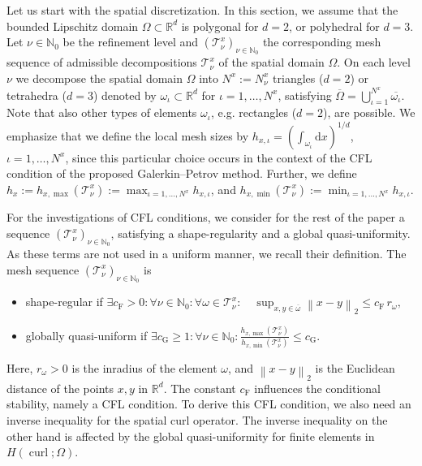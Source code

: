 \documentclass[a4paper,11pt]{article}
\newcommand{\N}{\mathbb N}
\newcommand{\R}{\mathbb R}
\newcommand{\cu}{\operatorname{curl}}
\newcommand{\norm}[1]{{\left\lVert{#1}\right\rVert}}
\begin{document}
Let us start with the spatial discretization. In this section, we assume that the bounded Lipschitz domain $\Omega \subset \R^d$ is polygonal for $d=2$, or polyhedral for $d=3$. Let $\nu \in \N_0$ be the refinement level and $( \mathcal T^x_\nu )_{\nu \in \N_0}$ the corresponding mesh sequence of admissible decompositions $\mathcal T^x_\nu$ of the spatial domain $\Omega$. On each level $\nu$ we decompose the spatial domain $\Omega$ into $N^x:=N^x_\nu$ triangles ($d=2$) or tetrahedra ($d=3$) denoted by $\omega_\iota \subset \R^d$ for $\iota=1,\dots, N^x$, satisfying $\overline{\Omega} = \bigcup_{\iota=1}^{N^x} \overline{\omega_{\iota}}.$ Note that also other types of elements $\omega_\iota$, e.g. rectangles ($d=2$), are possible. We emphasize that we define the local mesh sizes by $h_{x,\iota} = \left( \int_{\omega_\iota} \mathrm dx \right)^{1/d}$, $\iota=1,\dots, N^x$, since this particular choice occurs in the context of the CFL condition of the proposed Galerkin--Petrov method. Further, we define $h_x := h_{x,\max}(\mathcal T^x_\nu) := \max_{\iota=1,\dots, N^x} h_{x,\iota}$, and $h_{x,\min}(\mathcal T^x_\nu) := \min_{\iota=1,\dots, N^x} h_{x,\iota}$. 

For the investigations of CFL conditions, we consider for the rest of the paper a sequence $( \mathcal T^x_\nu )_{\nu \in \N_0}$, satisfying a shape-regularity and a global quasi-uniformity. As these terms are not used in a uniform manner, we recall their definition. The mesh sequence $( \mathcal T^x_\nu )_{\nu \in \N_0}$ is
\begin{itemize}
  \item shape-regular if $\exists c_\mathrm F > 0: \forall \nu \in \N_0 : \forall \omega \in \mathcal T^x_\nu: \quad \sup_{x,y \in \overline{\omega} } \norm{x- y}_2 \leq c_\mathrm F\, r_\omega,$
  \item globally quasi-uniform if $\exists c_\mathrm G \geq 1: \forall \nu \in \N_0 :  \frac{h_{x,\max}(\mathcal T^x_\nu)}{h_{x,\min}(\mathcal T^x_\nu)} \leq c_\mathrm G.$
\end{itemize}
Here, $r_\omega >0$ is the inradius of the element $\omega$, and $\norm{x-y}_2$ is the Euclidean distance of the points $x,y$ in $\R^d.$  The constant $c_{\mathrm F}$ influences the conditional stability, namely a CFL condition. To derive this CFL condition, we also need an inverse inequality for the spatial curl operator. The inverse inequality on the other hand is affected by the global quasi-uniformity for finite elements in $H(\cu;\Omega)$.
\end{document}
